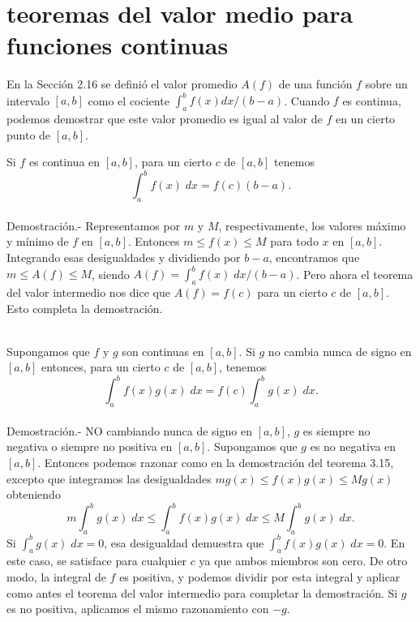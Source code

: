 \section{teoremas del valor medio para funciones continuas}
En la Sección 2.16 se definió el valor promedio $A(f)$ de una función $f$ sobre un intervalo $[a, b]$ como el cociente $\displaystyle\int_a^b f(x) dx / (b-a)$. Cuando $f$ es continua, podemos demostrar que este valor promedio es igual al valor de $f$ en un cierto punto de $[a, b]$.\\

\begin{teo}
    Si $f$ es continua en $[a,b]$, para un cierto $c$ de $[a,b]$ tenemos
    $$\int_a^b f(x)\; dx = f(c)(b-a).$$\\
	Demostración.-\; Representamos por $m$ y $M$, respectivamente, los valores máximo y mínimo de $f$ en $[a,b]$. Entonces $m\leq f(x)\leq M$ para todo $x$ en $[a,b]$. Integrando esas desigualdades y dividiendo por $b-a$, encontramos que $m\leq A(f)\leq M$, siendo $A(f)=\displaystyle\int_a^b f(x)\; dx / (b-a)$. Pero ahora el teorema del valor intermedio nos dice que $A(f)=f(c)$ para un cierto $c$ de $[a,b]$. Esto completa la demostración.\\\\
\end{teo}

\begin{teo}
    Supongamos que $f$ y $g$ son continuas en $[a,b]$. Si $g$ no cambia nunca de signo en $[a,b]$ entonces, para un cierto $c$ de $[a,b]$, tenemos
    $$\int_a^b f(x)g(x)\; dx = f(c)\int_a^b g(x)\; dx.$$\\
    Demostración.-\; NO cambiando nunca de signo en $[a,b]$, $g$ es siempre no negativa o siempre no positiva en $[a,b]$. Supongamos que $g$ es no negativa en $[a,b]$. Entonces podemos razonar como en la demostración del teorema 3.15, excepto que integramos las desigualdades $mg(x)\leq f(x)g(x)\leq Mg(x)$ obteniendo
    $$m\int_a^b g(x)\; dx \leq \int_a^b f(x)g(x)\; dx \leq M\int_a^b g(x)\; dx.$$
    Si $\displaystyle\int_a^b g(x)\; dx = 0$, esa desigualdad demuestra que $\displaystyle\int_a^b f(x)g(x)\; dx=0$. En este caso, se satisface para cualquier $c$ ya que ambos miembros son cero. De otro modo, la integral de $f$ es positiva, y podemos dividir por esta integral y aplicar como antes el teorema del valor intermedio para completar la demostración. Si $g$ es no positiva, aplicamos el mismo razonamiento con $-g$.\\
\end{teo}

